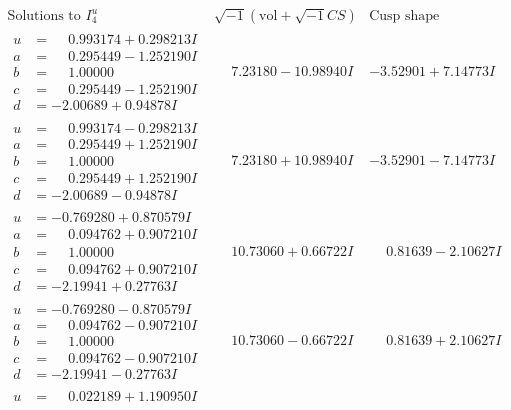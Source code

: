 \documentclass[1p]{elsarticle_modified}
\theoremstyle{definition}
\newcommand{\I}{\sqrt{-1}}
\begin{document}
$$\begin{array}{c|c|c}  
\text{Solutions to }I^u_{4}& \I (\text{vol} + \sqrt{-1}CS) & \text{Cusp shape}\\
 \hline 
\begin{aligned}
u &= \phantom{-}0.993174 + 0.298213 I \\
a &= \phantom{-}0.295449 - 1.252190 I \\
b &= \phantom{-}1.00000\phantom{ +0.000000I} \\
c &= \phantom{-}0.295449 - 1.252190 I \\
d &= -2.00689 + 0.94878 I\end{aligned}
 & \phantom{-}7.23180 - 10.98940 I & -3.52901 + 7.14773 I \\ \hline\begin{aligned}
u &= \phantom{-}0.993174 - 0.298213 I \\
a &= \phantom{-}0.295449 + 1.252190 I \\
b &= \phantom{-}1.00000\phantom{ +0.000000I} \\
c &= \phantom{-}0.295449 + 1.252190 I \\
d &= -2.00689 - 0.94878 I\end{aligned}
 & \phantom{-}7.23180 + 10.98940 I & -3.52901 - 7.14773 I \\ \hline\begin{aligned}
u &= -0.769280 + 0.870579 I \\
a &= \phantom{-}0.094762 + 0.907210 I \\
b &= \phantom{-}1.00000\phantom{ +0.000000I} \\
c &= \phantom{-}0.094762 + 0.907210 I \\
d &= -2.19941 + 0.27763 I\end{aligned}
 & \phantom{-}10.73060 + 0.66722 I & \phantom{-}0.81639 - 2.10627 I \\ \hline\begin{aligned}
u &= -0.769280 - 0.870579 I \\
a &= \phantom{-}0.094762 - 0.907210 I \\
b &= \phantom{-}1.00000\phantom{ +0.000000I} \\
c &= \phantom{-}0.094762 - 0.907210 I \\
d &= -2.19941 - 0.27763 I\end{aligned}
 & \phantom{-}10.73060 - 0.66722 I & \phantom{-}0.81639 + 2.10627 I \\ \hline\begin{aligned}
u &= \phantom{-}0.022189 + 1.190950 I \\

\end{aligned}
\end{array}$$
\end{document}
